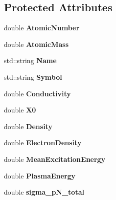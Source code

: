 \subsection*{Protected Attributes}
\begin{DoxyCompactItemize}
\item 
\mbox{\label{classMaterial_ac0ccfacb2c0e5fce5c71b514e85fc5fb}} 
double {\bfseries Atomic\+Number}
\item 
\mbox{\label{classMaterial_a463456d67fa4d325597555cec005dda3}} 
double {\bfseries Atomic\+Mass}
\item 
\mbox{\label{classMaterial_a793dc9034c137caf3d8b3b4b0f9d451b}} 
std\+::string {\bfseries Name}
\item 
\mbox{\label{classMaterial_a65e583d5eb0f35a6d950ac6228b76f31}} 
std\+::string {\bfseries Symbol}
\item 
\mbox{\label{classMaterial_a6f1efaa0cf74c0cbd7e22cb777100a5b}} 
double {\bfseries Conductivity}
\item 
\mbox{\label{classMaterial_a23031909b4e2203e7b8027655c6760b0}} 
double {\bfseries X0}
\item 
\mbox{\label{classMaterial_a8aa89c76c5b6a64f821ebdda6507da92}} 
double {\bfseries Density}
\item 
\mbox{\label{classMaterial_a93eb8d7244aa2be7bcae77d9bbaa7eba}} 
double {\bfseries Electron\+Density}
\item 
\mbox{\label{classMaterial_a168447e2e98e789579f36d2e323a8805}} 
double {\bfseries Mean\+Excitation\+Energy}
\item 
\mbox{\label{classMaterial_a9de62c98b49dfdc122010aaf0d62e1f4}} 
double {\bfseries Plasma\+Energy}
\item 
\mbox{\label{classMaterial_ab226917288b30b78bde617bbc4982fe6}} 
double {\bfseries sigma\+\_\+p\+N\+\_\+total}
\item 
\mbox{\label{classMaterial_a0d0e1af53e41de965f1ce59415b7ce6a}} 

\end{DoxyCompactItemize}
